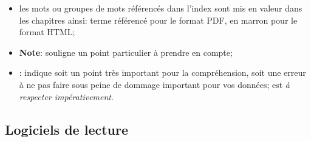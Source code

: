 \begin{itemize}
	\item les mots ou groupes de mots référencés dans l'index sont mis en valeur dans les chapitres ainsi:
		\newline
		\hspace*{1.5cm}\textopenbullet{} \textsf{terme référencé} pour le format \gls{PDF},
		\newline
		\hspace*{1.5cm}\textopenbullet{} en marron pour le format \gls{HTML};
	\item \textbf{Note}: souligne un point particulier à prendre en compte;
	\item \textcolor{red}{}: indique soit un point très important pour la compréhension, soit une erreur à ne pas faire sous peine de dommage important pour vos données;\newline
	\textcolor{red}{} est \emph{à respecter impérativement}.
\end{itemize} 



\subsection{Logiciels de lecture\label{introduction-manual-readers}}

